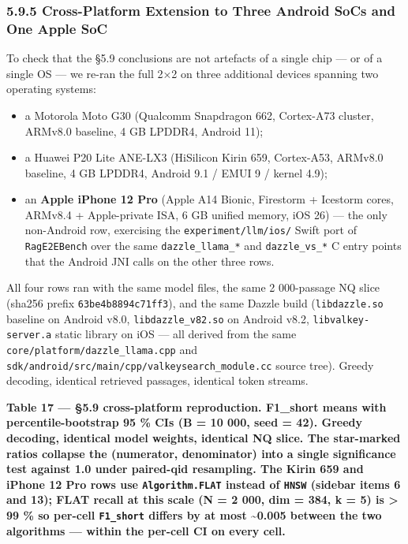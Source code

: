 \subsubsection{5.9.5 Cross-Platform Extension to Three Android SoCs and One
Apple
SoC}\label{cross-platform-extension-to-three-android-socs-and-one-apple-soc}

To check that the §5.9 conclusions are not artefacts of a single chip --- or of
a single OS --- we re-ran the full 2×2 on three additional devices spanning two
operating systems:

\begin{itemize}
\tightlist
\item
  a Motorola Moto G30 (Qualcomm Snapdragon 662, Cortex-A73 cluster, ARMv8.0
  baseline, 4 GB LPDDR4, Android 11);
\item
  a Huawei P20 Lite ANE-LX3 (HiSilicon Kirin 659, Cortex-A53, ARMv8.0 baseline,
  4 GB LPDDR4, Android 9.1 / EMUI 9 / kernel 4.9);
\item
  an \textbf{Apple iPhone 12 Pro} (Apple A14 Bionic, Firestorm + Icestorm cores,
  ARMv8.4 + Apple-private ISA, 6 GB unified memory, iOS 26) --- the only
  non-Android row, exercising the \texttt{experiment/llm/ios/} Swift port of
  \texttt{RagE2EBench} over the same \texttt{dazzle\_llama\_*} and
  \texttt{dazzle\_vs\_*} C entry points that the Android JNI calls on the other
  three rows.
\end{itemize}

All four rows ran with the same model files, the same 2 000-passage NQ slice
(sha256 prefix \texttt{63be4b8894c71ff3}), and the same Dazzle build
(\texttt{libdazzle.so} baseline on Android v8.0, \texttt{libdazzle\_v82.so} on
Android v8.2, \texttt{libvalkey-server.a} static library on iOS --- all derived
from the same \texttt{core/platform/dazzle\_llama.cpp} and
\texttt{sdk/android/src/main/cpp/valkeysearch\_module.cc} source tree). Greedy
decoding, identical retrieved passages, identical token streams.

\textbf{Table 17 --- §5.9 cross-platform reproduction. F1\_short means with
percentile-bootstrap 95 \% CIs (B = 10 000, seed = 42). Greedy decoding,
identical model weights, identical NQ slice. The star-marked ratios collapse the
(numerator, denominator) into a single significance test against 1.0 under
paired-qid resampling. The Kirin 659 and iPhone 12 Pro rows use
\texttt{Algorithm.FLAT} instead of \texttt{HNSW} (sidebar items 6 and 13); FLAT
recall at this scale (N = 2 000, dim = 384, k = 5) is \textgreater{} 99 \% so
per-cell \texttt{F1\_short} differs by at most \textasciitilde0.005 between the
two algorithms --- within the per-cell CI on every cell.}

